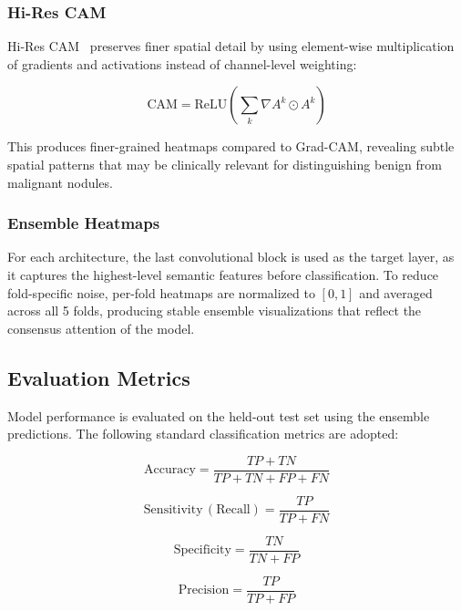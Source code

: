 \documentclass[conference]{IEEEtran}
\begin{document}
\subsubsection{Hi-Res CAM}

\medskip
Hi-Res CAM~\cite{Draelos2021HiResCAM} preserves finer spatial detail by using element-wise
multiplication of gradients and activations instead of channel-level weighting:

\begin{equation}
  \mathrm{CAM} = \mathrm{ReLU}\!\left(\sum_k \nabla A^k \odot A^k\right)
\end{equation}

This produces finer-grained heatmaps compared to Grad-CAM, revealing subtle spatial patterns
that may be clinically relevant for distinguishing benign from malignant nodules.

\subsubsection{Ensemble Heatmaps}

\medskip
For each architecture, the last convolutional block is used as the target layer, as it captures
the highest-level semantic features before classification. To reduce fold-specific noise,
per-fold heatmaps are normalized to $[0, 1]$ and averaged across all 5 folds, producing stable
ensemble visualizations that reflect the consensus attention of the model.

\subsection{Evaluation Metrics}

\medskip
Model performance is evaluated on the held-out test set using the ensemble predictions. The
following standard classification metrics are adopted:

\begin{equation}
  \mathrm{Accuracy} = \frac{TP + TN}{TP + TN + FP + FN}
\end{equation}

\begin{equation}
  \mathrm{Sensitivity\,(Recall)} = \frac{TP}{TP + FN}
\end{equation}

\begin{equation}
  \mathrm{Specificity} = \frac{TN}{TN + FP}
\end{equation}

\begin{equation}
  \mathrm{Precision} = \frac{TP}{TP + FP}
\end{equation}
\end{document}
